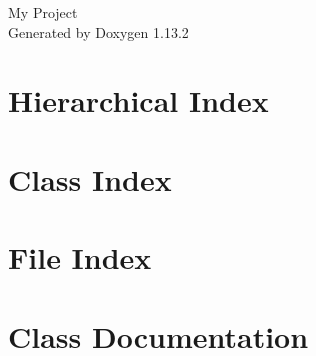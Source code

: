 \documentclass[twoside]{book}
\newcommand{\+}{\discretionary{\mbox{\scriptsize$\hookleftarrow$}}{}{}}
\newcommand{\clearemptydoublepage}{%
    \newpage{\pagestyle{empty}\cleardoublepage}%
  }
\begin{document}
  \raggedbottom
    \hypersetup{pageanchor=false,
                bookmarksnumbered=true,
                pdfencoding=unicode
               }
  \begin{titlepage}
  \vspace*{7cm}
  \begin{center}%
  {\Large My Project}\\
  \vspace*{1cm}
  {\large Generated by Doxygen 1.13.2}\\
  \end{center}
  \end{titlepage}
  \clearemptydoublepage
  \tableofcontents
  \clearemptydoublepage
  \hypersetup{pageanchor=true}
\chapter{Hierarchical Index}

\chapter{Class Index}

\chapter{File Index}

\chapter{Class Documentation}




























\end{document}
